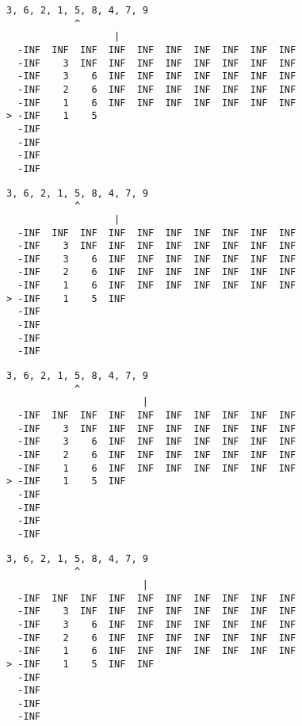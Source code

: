{ \begin{verbatim}
3, 6, 2, 1, 5, 8, 4, 7, 9
            ^
                   |
  -INF  INF  INF  INF  INF  INF  INF  INF  INF  INF
  -INF    3  INF  INF  INF  INF  INF  INF  INF  INF
  -INF    3    6  INF  INF  INF  INF  INF  INF  INF
  -INF    2    6  INF  INF  INF  INF  INF  INF  INF
  -INF    1    6  INF  INF  INF  INF  INF  INF  INF
> -INF    1    5                                   
  -INF                                             
  -INF                                             
  -INF                                             
  -INF                                             
\end{verbatim} }

{ \begin{verbatim}
3, 6, 2, 1, 5, 8, 4, 7, 9
            ^
                   |
  -INF  INF  INF  INF  INF  INF  INF  INF  INF  INF
  -INF    3  INF  INF  INF  INF  INF  INF  INF  INF
  -INF    3    6  INF  INF  INF  INF  INF  INF  INF
  -INF    2    6  INF  INF  INF  INF  INF  INF  INF
  -INF    1    6  INF  INF  INF  INF  INF  INF  INF
> -INF    1    5  INF                              
  -INF                                             
  -INF                                             
  -INF                                             
  -INF                                             
\end{verbatim} }

{ \begin{verbatim}
3, 6, 2, 1, 5, 8, 4, 7, 9
            ^
                        |
  -INF  INF  INF  INF  INF  INF  INF  INF  INF  INF
  -INF    3  INF  INF  INF  INF  INF  INF  INF  INF
  -INF    3    6  INF  INF  INF  INF  INF  INF  INF
  -INF    2    6  INF  INF  INF  INF  INF  INF  INF
  -INF    1    6  INF  INF  INF  INF  INF  INF  INF
> -INF    1    5  INF                              
  -INF                                             
  -INF                                             
  -INF                                             
  -INF                                             
\end{verbatim} }

{ \begin{verbatim}
3, 6, 2, 1, 5, 8, 4, 7, 9
            ^
                        |
  -INF  INF  INF  INF  INF  INF  INF  INF  INF  INF
  -INF    3  INF  INF  INF  INF  INF  INF  INF  INF
  -INF    3    6  INF  INF  INF  INF  INF  INF  INF
  -INF    2    6  INF  INF  INF  INF  INF  INF  INF
  -INF    1    6  INF  INF  INF  INF  INF  INF  INF
> -INF    1    5  INF  INF                         
  -INF                                             
  -INF                                             
  -INF                                             
  -INF                                             
\end{verbatim} }

